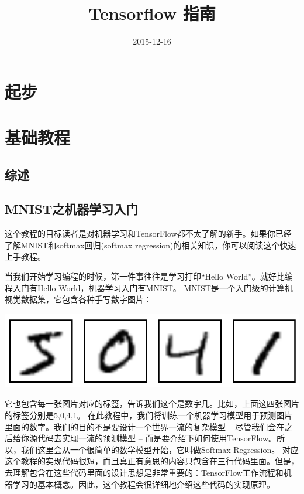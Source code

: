 \documentclass[a4paper,11pt,twoside]{ctexart}
\title{Tensorflow 指南}
\author{}
\date{2015-12-16}
\begin{document}
\maketitle
\newpage
\tableofcontents
\newpage

\section{起步}

\section{基础教程}
\subsection {综述}

\subsection {MNIST之机器学习入门}


这个教程的目标读者是对机器学习和TensorFlow都不太了解的新手。如果你已经了解MNIST和softmax回归(softmax regression)的相关知识，你可以阅读这个快速上手教程。


当我们开始学习编程的时候，第一件事往往是学习打印“Hello World”。就好比编程入门有Hello World，机器学习入门有MNIST。
MNIST是一个入门级的计算机视觉数据集，它包含各种手写数字图片：

\includegraphics[width=.8\textwidth]{../SOURCE/images/MNIST.png}

它也包含每一张图片对应的标签，告诉我们这个是数字几。比如，上面这四张图片的标签分别是5,0,4,1。
在此教程中，我们将训练一个机器学习模型用于预测图片里面的数字。我们的目的不是要设计一个世界一流的复杂模型 -- 尽管我们会在之后给你源代码去实现一流的预测模型 -- 而是要介绍下如何使用TensorFlow。所以，我们这里会从一个很简单的数学模型开始，它叫做Softmax Regression。
对应这个教程的实现代码很短，而且真正有意思的内容只包含在三行代码里面。但是，去理解包含在这些代码里面的设计思想是非常重要的：TensorFlow工作流程和机器学习的基本概念。因此，这个教程会很详细地介绍这些代码的实现原理。
\end{document}
